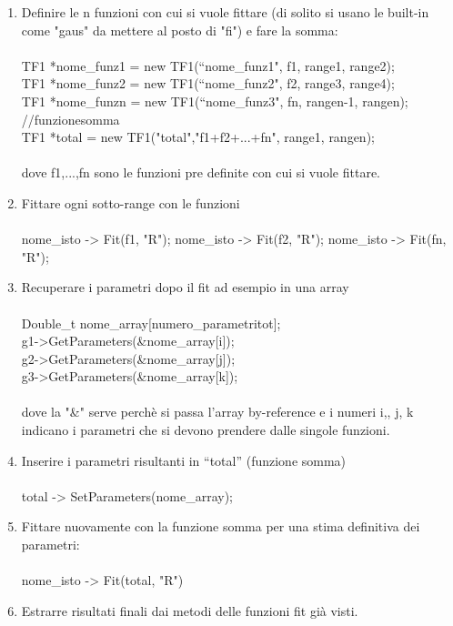 \documentclass[10pt,a4paper]{article}
\begin{document}
\begin{enumerate}
	\item Definire le n funzioni con cui si vuole fittare (di solito si usano le built-in come "gaus" da mettere al posto di "fi") e fare la somma:\\\\
	TF1 *nome\_funz1 = new TF1(“nome\_funz1", f1, range1, range2);\\
	TF1 *nome\_funz2 = new TF1(“nome\_funz2", f2, range3, range4);\\
	TF1 *nome\_funzn = new TF1(“nome\_funz3", fn, rangen-1, rangen);\\
	//funzionesomma\\
	TF1 *total = new TF1("total","f1+f2+...+fn", range1, rangen);\\\\
	dove f1,...,fn sono le funzioni pre definite con cui si vuole fittare. 
	\item Fittare ogni sotto-range con le funzioni\\\\
	nome\_isto -> Fit(f1, "R");
	nome\_isto -> Fit(f2, "R");
	nome\_isto -> Fit(fn, "R");
	\item Recuperare i parametri dopo il fit ad esempio in una array\\\\
	Double\_t nome\_array[numero\_parametritot];\\
	g1->GetParameters(\&nome\_array[i]);\\
	g2->GetParameters(\&nome\_array[j]);\\
	g3->GetParameters(\&nome\_array[k]);\\\\
	dove la "\&" serve perchè si passa l'array by-reference e i numeri i,, j, k indicano i parametri che si devono prendere dalle singole funzioni. 
	\item Inserire i parametri risultanti in “total” (funzione somma)\\\\
	total -> SetParameters(nome\_array);\\
	\item Fittare nuovamente con la funzione somma per una stima definitiva dei parametri:\\\\
	nome\_isto -> Fit(total, "R")\\
	\item Estrarre risultati finali dai metodi delle funzioni fit già visti.
\end{enumerate}
\end{document}
